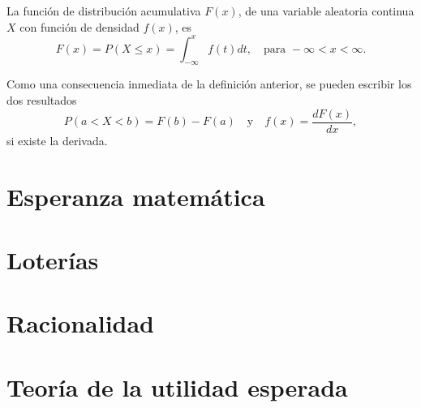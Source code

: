 \begin{definicion}{}{}
    La función de distribución acumulativa $F(x)$, de una variable aleatoria continua $X$ con función de densidad $f(x)$, es
    $$F(x) = P(X \leq x) = \int_{-\infty}^{x} f(t) dt, \quad \text{para } -\infty < x < \infty .$$
\end{definicion}

Como una consecuencia inmediata de la definición anterior, se pueden escribir los dos resultados
$$P(a < X < b) = F(b) - F(a) \quad \text{y} \quad f(x) = \frac{dF(x)}{dx},$$
si existe la derivada.

\section{Esperanza matemática}

\section{Loterías}

\section{Racionalidad}

\section{Teoría de la utilidad esperada}